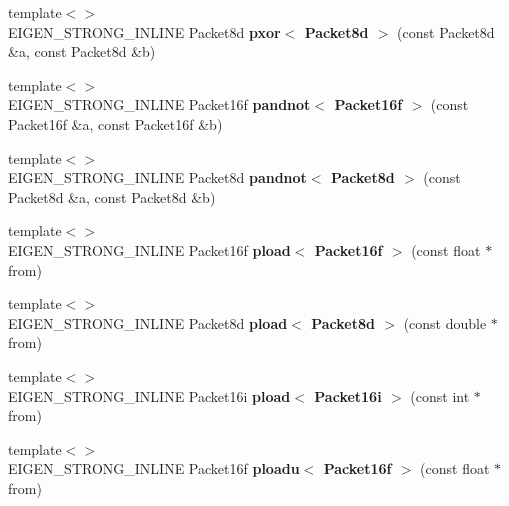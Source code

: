 \begin{DoxyCompactItemize}
{\footnotesize template$<$$>$ }\\E\+I\+G\+E\+N\+\_\+\+S\+T\+R\+O\+N\+G\+\_\+\+I\+N\+L\+I\+NE Packet8d {\bfseries pxor$<$ Packet8d $>$} (const Packet8d \&a, const Packet8d \&b)
\item 
\mbox{\label{namespace_eigen_1_1internal_a97159bd99b1f609f3311b8e548525629}} 
{\footnotesize template$<$$>$ }\\E\+I\+G\+E\+N\+\_\+\+S\+T\+R\+O\+N\+G\+\_\+\+I\+N\+L\+I\+NE Packet16f {\bfseries pandnot$<$ Packet16f $>$} (const Packet16f \&a, const Packet16f \&b)
\item 
\mbox{\label{namespace_eigen_1_1internal_a005a413ac67fcec9162e22593906e1da}} 
{\footnotesize template$<$$>$ }\\E\+I\+G\+E\+N\+\_\+\+S\+T\+R\+O\+N\+G\+\_\+\+I\+N\+L\+I\+NE Packet8d {\bfseries pandnot$<$ Packet8d $>$} (const Packet8d \&a, const Packet8d \&b)
\item 
\mbox{\label{namespace_eigen_1_1internal_a9bcedac3d74942d7672f16337cc73a8a}} 
{\footnotesize template$<$$>$ }\\E\+I\+G\+E\+N\+\_\+\+S\+T\+R\+O\+N\+G\+\_\+\+I\+N\+L\+I\+NE Packet16f {\bfseries pload$<$ Packet16f $>$} (const float $\ast$from)
\item 
\mbox{\label{namespace_eigen_1_1internal_a0bb5a18c4e1f622ebf6017e53920b33d}} 
{\footnotesize template$<$$>$ }\\E\+I\+G\+E\+N\+\_\+\+S\+T\+R\+O\+N\+G\+\_\+\+I\+N\+L\+I\+NE Packet8d {\bfseries pload$<$ Packet8d $>$} (const double $\ast$from)
\item 
\mbox{\label{namespace_eigen_1_1internal_acfcda63c40593aa27211b1b9aa04af33}} 
{\footnotesize template$<$$>$ }\\E\+I\+G\+E\+N\+\_\+\+S\+T\+R\+O\+N\+G\+\_\+\+I\+N\+L\+I\+NE Packet16i {\bfseries pload$<$ Packet16i $>$} (const int $\ast$from)
\item 
\mbox{\label{namespace_eigen_1_1internal_a4272ecbcc99acc876ea4ac438162efff}} 
{\footnotesize template$<$$>$ }\\E\+I\+G\+E\+N\+\_\+\+S\+T\+R\+O\+N\+G\+\_\+\+I\+N\+L\+I\+NE Packet16f {\bfseries ploadu$<$ Packet16f $>$} (const float $\ast$from)

\end{DoxyCompactItemize}
